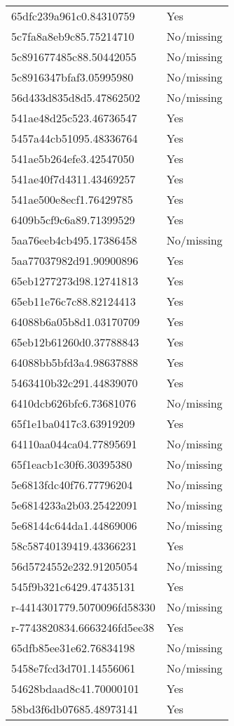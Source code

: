 \begin{tabular}{ll}
65dfc239a961c0.84310759 & Yes \\
5c7fa8a8eb9c85.75214710 & No/missing \\
5c891677485c88.50442055 & No/missing \\
5c8916347bfaf3.05995980 & No/missing \\
56d433d835d8d5.47862502 & No/missing \\
541ae48d25c523.46736547 & Yes \\
5457a44cb51095.48336764 & Yes \\
541ae5b264efe3.42547050 & Yes \\
541ae40f7d4311.43469257 & Yes \\
541ae500e8ecf1.76429785 & Yes \\
6409b5cf9c6a89.71399529 & Yes \\
5aa76eeb4cb495.17386458 & No/missing \\
5aa77037982d91.90900896 & Yes \\
65eb1277273d98.12741813 & Yes \\
65eb11e76c7c88.82124413 & Yes \\
64088b6a05b8d1.03170709 & Yes \\
65eb12b61260d0.37788843 & Yes \\
64088bb5bfd3a4.98637888 & Yes \\
5463410b32c291.44839070 & Yes \\
6410dcb626bfc6.73681076 & No/missing \\
65f1e1ba0417c3.63919209 & Yes \\
64110aa044ca04.77895691 & No/missing \\
65f1eacb1c30f6.30395380 & No/missing \\
5e6813fdc40f76.77796204 & No/missing \\
5e6814233a2b03.25422091 & No/missing \\
5e68144c644da1.44869006 & No/missing \\
58c58740139419.43366231 & Yes \\
56d5724552e232.91205054 & No/missing \\
545f9b321c6429.47435131 & Yes \\
r-4414301779.5070096fd58330 & No/missing \\
r-7743820834.6663246fd5ee38 & Yes \\
65dfb85ee31e62.76834198 & No/missing \\
5458e7fcd3d701.14556061 & No/missing \\
54628bdaad8c41.70000101 & Yes \\
58bd3f6db07685.48973141 & Yes \\

\end{tabular}
